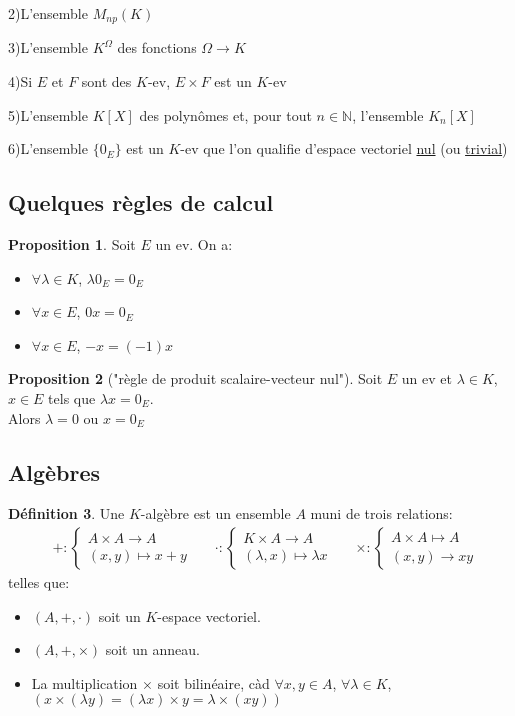 \documentclass[10pt,a4paper]{article}
\theoremstyle{definition}
\newtheorem{proposition}{Proposition}[section]
\newtheorem{definition}[proposition]{Définition}
\begin{document}
2)L'ensemble $M_{np}(K)$

3)L'ensemble $K^\Omega$ des fonctions $\Omega \to K$

4)Si $E$ et $F$ sont des $K$-ev, $E \times F$ est un $K$-ev

5)L'ensemble $K[X]$ des polynômes et, pour tout $n \in \mathbb{N}$, l'ensemble $K_n[X]$

6)L'ensemble $\{0_E\}$ est un $K$-ev que l'on qualifie d'espace vectoriel \uline{nul} (ou \uline{trivial})

\subsection{Quelques règles de calcul}
\begin{proposition}
Soit $E$ un ev.
On a:
\begin{itemize}
\item $\forall \lambda \in K$, $\lambda 0_E = 0_E$
\item $\forall x \in E$, $0x = 0_E$
\item $\forall x \in E$, $-x = (-1)x$
\end{itemize}
\end{proposition}
\begin{proposition}["règle de produit scalaire-vecteur nul"]
Soit $E$ un ev et $\lambda \in K$, $x \in E$ tels que $\lambda x = 0_E$. \\
Alors $\lambda = 0$ ou $x = 0_E$
\end{proposition}

\pagebreak

\subsection{Algèbres}
\begin{definition}
Une $K$-algèbre est un ensemble $A$ muni de trois relations:
\begin{align*}
&+: \begin{cases}
A \times A \to A \\
(x, y) \mapsto x + y
\end{cases}
&
&\cdot: \begin{cases}
K \times A \to A \\
(\lambda, x) \mapsto \lambda x
\end{cases}
&
&\times: \begin{cases}
A \times A \mapsto A \\
(x, y) \to xy
\end{cases}
\end{align*}
telles que:
\begin{itemize}
\item $(A, +, \cdot)$ soit un $K$-espace vectoriel.
\item $(A, +, \times)$ soit un anneau.
\item La multiplication $\times$ soit bilinéaire, càd $\forall x, y \in A$, $\forall \lambda \in K$, $(x \times (\lambda y) = (\lambda x) \times y = \lambda \times (x y))$
\end{itemize}
\end{definition}
\end{document}

